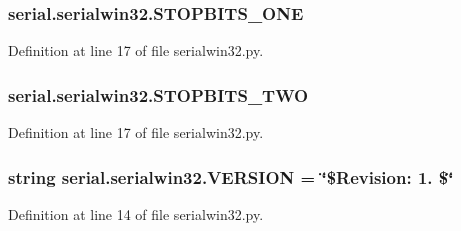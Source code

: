 \subsubsection[{\texorpdfstring{S\+T\+O\+P\+B\+I\+T\+S\+\_\+\+O\+NE}{STOPBITS_ONE}}]{\setlength{\rightskip}{0pt plus 5cm}serial.\+serialwin32.\+S\+T\+O\+P\+B\+I\+T\+S\+\_\+\+O\+NE}\hypertarget{namespaceserial_1_1serialwin32_a018c7f180189d6baa881646f60ade0ff}{}\label{namespaceserial_1_1serialwin32_a018c7f180189d6baa881646f60ade0ff}


Definition at line 17 of file serialwin32.\+py.

\subsubsection[{\texorpdfstring{S\+T\+O\+P\+B\+I\+T\+S\+\_\+\+T\+WO}{STOPBITS_TWO}}]{\setlength{\rightskip}{0pt plus 5cm}serial.\+serialwin32.\+S\+T\+O\+P\+B\+I\+T\+S\+\_\+\+T\+WO}\hypertarget{namespaceserial_1_1serialwin32_a21bb0fdf96f6cfb4cf75cb380b321661}{}\label{namespaceserial_1_1serialwin32_a21bb0fdf96f6cfb4cf75cb380b321661}


Definition at line 17 of file serialwin32.\+py.

\subsubsection[{\texorpdfstring{V\+E\+R\+S\+I\+ON}{VERSION}}]{\setlength{\rightskip}{0pt plus 5cm}string serial.\+serialwin32.\+V\+E\+R\+S\+I\+ON = \char`\"{}\$Revision\+: 1. \$\char`\"{}}\hypertarget{namespaceserial_1_1serialwin32_abab57d82bb0b959e172e6e85644adf71}{}\label{namespaceserial_1_1serialwin32_abab57d82bb0b959e172e6e85644adf71}


Definition at line 14 of file serialwin32.\+py.

